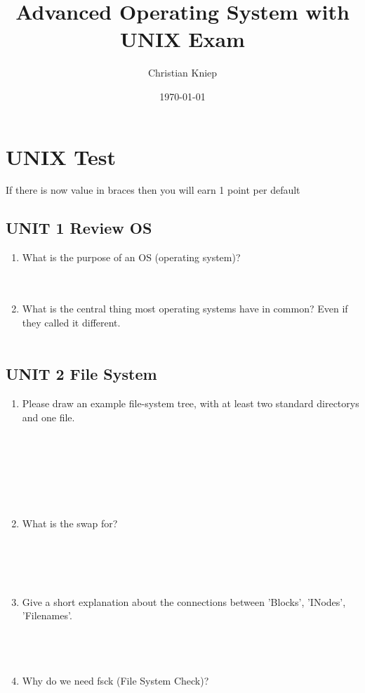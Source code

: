 \documentclass[11pt]{article}
\author{Christian Kniep}
\title{Advanced Operating System with UNIX Exam}
\date{\today}
\begin{document}
\maketitle
\section*{UNIX Test}
If there is now value in braces then you will earn 1 point per default
\subsection*{UNIT 1 Review OS}
\begin{enumerate}
    \item What is the purpose of an OS (operating system)? \\
    \\
    \\
    \item What is the central thing most operating systems have in common? Even if they called it different. \\
    \\    
\end{enumerate}

\newpage
\subsection*{UNIT 2 File System}
\begin{enumerate}
    \item Please draw an example file-system tree, with at least two standard directorys and one file. \\
    \\
    \\
    \\
    \\
    \\
    \\
    \item What is the swap for? \\
    \\
    \\
    \\
    \\
    \item Give a short explanation about the connections between 'Blocks', 'INodes', 'Filenames'.\\
    \\
    \\
    \\
    \item Why do we need fsck (File System Check)? \\
    \\
    \\
    \\    
\end{enumerate}
\end{document}
